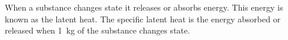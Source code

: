 \documentclass[revision-guide.tex]{subfiles}
\begin{document}

When a substance changes state it releases or absorbs energy. This energy is known as the latent heat. The specific latent heat is the energy absorbed or released when \SI{1}{\kilogram} of the substance changes state.
\end{document}
